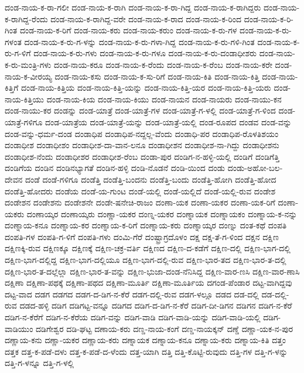 ದಂಡ-ನಾಯ-ಕ-ರಾ-ಗಲೀ
ದಂಡ-ನಾಯ-ಕ-ರಾಗಿ
ದಂಡ-ನಾಯ-ಕ-ರಾ-ಗಿದ್ದ
ದಂಡ-ನಾಯ-ಕ-ರಾಗಿದ್ದರು
ದಂಡ-ನಾಯ-ಕ-ರಾಗಿದ್ದ-ರೆಂದು
ದಂಡ-ನಾಯ-ಕ-ರಾಗಿದ್ದ-ವರೇ
ದಂಡ-ನಾಯ-ಕ-ರಾದ
ದಂಡ-ನಾಯ-ಕ-ರಿಂದ
ದಂಡ-ನಾಯ-ಕ-ರಿ-ಗಿಂತ
ದಂಡ-ನಾಯ-ಕ-ರಿಗೆ
ದಂಡ-ನಾಯ-ಕರು
ದಂಡ-ನಾಯ-ಕರುಂ
ದಂಡ-ನಾಯ-ಕ-ರು-ಗಳ
ದಂಡ-ನಾಯ-ಕ-ರು-ಗಳಂತ
ದಂಡ-ನಾಯ-ಕ-ರು-ಗ-ಳನ್ನು
ದಂಡ-ನಾಯ-ಕ-ರು-ಗಳಾ-ಗಿದ್ದ
ದಂಡ-ನಾಯ-ಕ-ರು-ಗಳಿ-ಗಿಂತ
ದಂಡ-ನಾಯ-ಕ-ರು-ಗ-ಳಿಗೆ
ದಂಡ-ನಾಯ-ಕ-ರು-ಗಳು
ದಂಡ-ನಾಯ-ಕ-ರು-ಗಳೂ
ದಂಡ-ನಾಯ-ಕ-ರು-ದಂಡಾಧೀಶರು
ದಂಡ-ನಾಯ-ಕ-ರು-ಮಂತ್ರಿ-ಗಳು
ದಂಡ-ನಾಯ-ಕರೂ
ದಂಡ-ನಾಯ-ಕ-ರೆಂದು
ದಂಡ-ನಾಯ-ಕ-ರೆಂಬ
ದಂಡ-ನಾಯ-ಕರೇ
ದಂಡ-ನಾಯ-ಕ-ವೀರಯ್ಯ
ದಂಡ-ನಾಯ-ಕಸು
ದಂಡ-ನಾಯ-ಕ-ಸು-ರಿಗೆ
ದಂಡ-ನಾಯ-ಕಿತಿ
ದಂಡ-ನಾಯ-ಕಿತ್ತಿ
ದಂಡ-ನಾಯ-ಕಿತ್ತಿಗೆ
ದಂಡ-ನಾಯ-ಕಿತ್ತಿಯ
ದಂಡ-ನಾಯ-ಕಿತ್ತಿ-ಯನ್ನು
ದಂಡ-ನಾಯ-ಕಿತ್ತಿ-ಯರ
ದಂಡ-ನಾಯ-ಕಿತ್ತಿ-ಯರು
ದಂಡ-ನಾಯ-ಕಿತ್ತಿಯು
ದಂಡ-ನಾಯ-ಕಿಯ
ದಂಡ-ನಾಯ-ಕಿಯು
ದಂಡ-ನಾಯನ
ದಂಡ-ನಾಯರು
ದಂಡ-ನಾಯು-ಕನ
ದಂಡ-ನಾಯು-ಕರ
ದಂಡನ್ನು
ದಂಡ-ಯಾತ್ರೆ
ದಂಡ-ಯಾತ್ರೆ-ಗಳ
ದಂಡ-ಯಾತ್ರೆ-ಗ-ಳಲ್ಲಿ
ದಂಡ-ಯಾತ್ರೆ-ಗ-ಳಿಂದ
ದಂಡ-ಯಾತ್ರೆ-ಗಳಿಗೂ
ದಂಡ-ಯಾತ್ರೆಯ
ದಂಡ-ಯಾತ್ರೆ-ಯನ್ನು
ದಂಡ-ಯಾತ್ರೆ-ಯಲ್ಲಿ
ದಂಡ-ರೂಪದ
ದಂಡವ
ದಂಡ-ವನ್ನು
ದಂಡ-ವನ್ನು-ಧರ್ಮ-ದಂಡ
ದಂಡಾಧಿಪ
ದಂಡಾಧಿಪ-ನದ್ದಲ್ಲ-ವೆಂದು
ದಂಡಾಧಿ-ಪರ
ದಂಡಾಧಿಪ-ರೊಳತಿಶಯಂ
ದಂಡಾಧೀಶ
ದಂಡಾಧೀಶಂ
ದಂಡಾಧೀಶ-ದಾ-ವಾನ-ಲನೂ
ದಂಡಾಧೀಶನ
ದಂಡಾಧೀಶ-ನಾ-ಗಿದ್ದು
ದಂಡಾಧೀಶನು
ದಂಡಾಧೀಶ-ನೆಂದು
ದಂಡಾಧೀಶರ
ದಂಡಾಧೀಶ-ರೆಂಬ
ದಂಡಾ-ಪುರ
ದಂಡಿಗ-ನ-ಹಳ್ಳಿ-ಯಲ್ಲಿ
ದಂಡಿಗೆ
ದಂಡಿಗೆತ್ತಿ
ದಂಡಿಗೆಯ
ದಂಡಿನ
ದಂಡಿನಭ್ಯಾಗತೆ
ದಂಡಿನ-ಹಳ್ಳಿ
ದಂಡಿ-ನೊಡನೆ
ದಂಡಿ-ಯಿಂದ
ದಂಡು
ದಂಡು-ಅಹೋ-ಬಲ-ದೇವನ
ದಂಡೆ
ದಂಡೆ-ಗಳಿಗೂ
ದಂಡೆತ್ತಿ
ದಂಡೆತ್ತಿ-ಬಂದನು
ದಂಡೆತ್ತಿ-ಬಂದು
ದಂಡೆತ್ತಿ-ಹೋಗಿ
ದಂಡೆತ್ತಿ-ಹೋದ
ದಂಡೆತ್ತಿ-ಹೋದರು
ದಂಡೆಯ
ದಂಡೆ-ಯ-ಗುಂಟ
ದಂಡೆ-ಯಲ್ಲಿ
ದಂಡೆ-ಯಲ್ಲಿದೆ
ದಂಡೆ-ಯಲ್ಲಿ-ರುವ
ದಂಡೇಶ
ದಂಡೇಶನ
ದಂಡೇಶನು
ದಂಡೇಶನೇ
ದಂಡೇ-ಷನೇಚಿ-ರಾಜಂ
ದಂಣಾ-ಯಕ
ದಂಣಾ-ಯಕರ
ದಂಣಾ-ಯಕ-ರಿಗೆ
ದಂಣಾ-ಯಕರು
ದಂಣಾಯ್ಕರ
ದಂಣಾಯ್ಕರು
ದಂಣ್ಣಾ-ಯಕರ
ದಂಣ್ನ-ಯಕರ
ದಂಣ್ನಾಯಕ
ದಂಣ್ನಾಯಕಂ
ದಂಣ್ನಾಯ-ಕ-ನನ್ನು
ದಂಣ್ನಾಯ-ಕನೂ
ದಂಣ್ನಾಯ-ಕರ
ದಂಣ್ನಾಯ-ಕ-ರಿಗೆ
ದಂಣ್ನಾಯ-ಕರು
ದಂಣ್ನಾಯ್ಕರ
ದಂಣ್ನು
ದಂತ-ಕಥೆ
ದಂಪತಿ
ದಂಪತಿ-ಗಳ
ದಂಪತಿ-ಗ-ಳಿಗೆ
ದಂಪತಿ-ಗಳು
ದಂಮಿ-ಗೆರೆ
ದಂಷ್ಟ್ರಾಗ್ರದೊಳಂ
ದಕ್ಷ
ದಕ್ಷ-ತೆ-ಗ-ಳಿಂದ
ದಕ್ಷನ
ದಕ್ಷಿಣ
ದಕ್ಷಿಣಕ್ಕಿ-ರುವ
ದಕ್ಷಿಣಕ್ಕೂ
ದಕ್ಷಿಣಕ್ಕೆ
ದಕ್ಷಿಣ-ಚಕ್ರ-ವರ್ತಿ
ದಕ್ಷಿಣದ
ದಕ್ಷಿಣ-ದ-ಕಡೆಗೆ
ದಕ್ಷಿಣ-ದಲ್ಲಿ
ದಕ್ಷಿಣ-ಭಾಗ-ದಲ್ಲಿ
ದಕ್ಷಿಣ-ಭಾಗ-ದಲ್ಲಿದ್ದ
ದಕ್ಷಿಣ-ಭಾಗ-ದಲ್ಲಿಯೂ
ದಕ್ಷಿಣ-ಭಾಗ-ದಲ್ಲಿ-ರುವ
ದಕ್ಷಿಣ-ಭಾರ-ತದ
ದಕ್ಷಿಣ-ಭಾರ-ತ-ದಲ್ಲಿ
ದಕ್ಷಿಣ-ಭಾರ-ತ-ದಲ್ಲೆಲ್ಲಾ
ದಕ್ಷಿಣ-ಭಾರ-ತ-ವನ್ನು
ದಕ್ಷಿಣ-ಭುಜಾ-ದಂಡ-ನೆನಿಸಿದ್ದ
ದಕ್ಷಿಣ-ವಾರ-ಣಸಿ
ದಕ್ಷಿಣ-ವಾರ-ಣಾಸಿ
ದಕ್ಷಿಣಾ
ದಕ್ಷಿಣಾ-ಪಥಕ್ಕೆ
ದಕ್ಷಿಣಾ-ಪಥದ
ದಕ್ಷಿಣಾ-ಮೂರ್ತಿ
ದಕ್ಷಿಣಾ-ಮೂರ್ತಿಯ
ದಗಂಡ-ಪೆಂಡಾರ
ದಟ್ಟ-ವಾಗಿದ್ದವು
ದಟ್ಟ-ವಾದ
ದಡಗ
ದಡಗದ
ದಡಗ-ದ-ಡಿಗ-ನ-ಕೆರೆ
ದಡಗ-ದಲ್ಲಿ-ರುವ
ದಡಗ-ಳಲ್ಲೂ
ದಡದ
ದಡ-ದಲ್ಲಿ
ದಡ-ದಲ್ಲಿ-ರುವ
ದಡದ-ಹಳ್ಳಿ
ದಡಿಗ
ದಡಿಗಟ್ಟ-ವನ್ನೂ
ದಡಿಗದ
ದಡಿಗ-ದ-ಡಿಗ-ನ-ಕೆರೆ
ದಡಿಗ-ದೀ-ಡಿಗನ
ದಡಿಗನ
ದಡಿಗ-ನ-ಕೆರೆ
ದಡಿಗ-ನ-ಕೆರೆಗೆ
ದಡಿಗ-ನ-ಕೆರೆಯ
ದಡಿಗ-ವನ್ನು
ದಡಿಗ-ವಾಡಿ
ದಡಿಗ-ವಾಡಿ-ಯನ್ನು
ದಡಿಗ-ವಾಡಿ-ಯಲ್ಲಿ
ದಡಿಗ-ವಾಡಿಯುಂ
ದಡಿಗೇಶ್ವರ
ದಡಿ-ಘಟ್ಟ
ದಣಾಯ-ಕರು
ದಣ್ಡ-ನಾಯ-ಕಂಗೆ
ದಣ್ಡ-ನಾಯಕ್ಕನ್
ದಣ್ಡೆ
ದಣ್ಣಾ-ಯಕ-ನ-ಪುರ
ದಣ್ಣಾಯ-ಕನು
ದಣ್ಣಾ-ಯಕರ
ದಣ್ಣಾಯ-ಕರು
ದಣ್ನಾಯಕ
ದಣ್ನಾಯ-ಕನೂ
ದಣ್ನಾಯ-ಕರು
ದಣ್ನಾಯ-ಕಿತಿ
ದತ್ತಂ
ದತ್ತಕ
ದತ್ತ-ಕ-ಪಡೆ-ದಳು
ದತ್ತ-ಕ-ಪಡೆ-ದ-ಳೆಂದು
ದತ್ತ-ಯಾಗಿ
ದತ್ತಿ
ದತ್ತಿ-ಕೊಟ್ಟಿ-ರುವುದು
ದತ್ತಿ-ಗಳ
ದತ್ತಿ-ಗ-ಳನ್ನು
ದತ್ತಿ-ಗ-ಳನ್ನೂ
ದತ್ತಿ-ಗ-ಳಲ್ಲಿ
